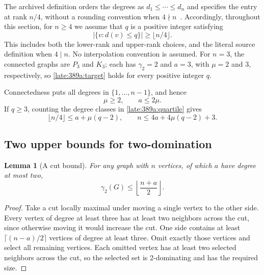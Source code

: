 \documentclass[11pt,a4paper]{article}
\newtheorem{lemma}[theorem]{Lemma}
\theoremstyle{definition}\newtheorem{definition}[theorem]{Definition}
\theoremstyle{remark}\newtheorem{remark}[theorem]{Remark}
\begin{document}
The archived definition orders the degrees as $d_1\le\cdots\le d_n$ and
specifies the entry at rank $n/4$, without a rounding convention when
$4\nmid n$~\cite{src:catalogue}. Accordingly, throughout this section,
for $n\ge4$ we assume that $q$ is a positive integer satisfying
\begin{equation}\label{late:389a:quartile}
 \bigl|\{v:d(v)\le q\}\bigr|\ge\lfloor n/4\rfloor.
\end{equation}
This includes both the lower-rank and upper-rank choices, and the literal
source definition when $4\mid n$. No interpolation convention is assumed.
For $n=3$, the connected graphs are $P_3$ and $K_3$; each has
$\gamma_2=2$ and $a=3$, with $\mu=2$ and $3$, respectively, so
\eqref{late:389a:target} holds for every positive integer $q$.

Connectedness puts all degrees in $\{1,\ldots,n-1\}$, and hence
\begin{equation}\label{late:389a:elementary}
 \mu\ge2,\qquad a\le2\mu.
\end{equation}
If $q\ge3$, counting the degree classes in \eqref{late:389a:quartile}
gives
\begin{equation}\label{late:389a:rank}
 \lfloor n/4\rfloor\le a+\mu(q-2),\qquad
 n\le4a+4\mu(q-2)+3.
\end{equation}

\subsection{Two upper bounds for two-domination}
\begin{lemma}[A cut bound]\label{late:389a:cut}
For any graph with $n$ vertices, of which $a$ have degree at most two,
\[
 \gamma_2(G)\le\left\lfloor\frac{n+a}{2}\right\rfloor.
\]
\end{lemma}
\begin{proof}
Take a cut locally maximal under moving a single vertex to the other side.
Every vertex of degree at least three has at least two neighbors across
the cut, since otherwise moving it would increase the cut. One side
contains at least $\lceil(n-a)/2\rceil$ vertices of degree at least three.
Omit exactly those vertices and select all remaining vertices. Each
omitted vertex has at least two selected neighbors across the cut, so the
selected set is 2-dominating and has the required size.
\end{proof}
\end{document}
